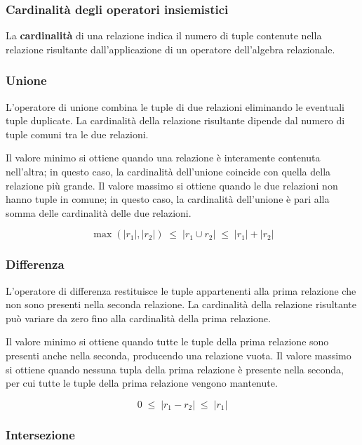 \subsubsection{Cardinalità degli operatori insiemistici}

La \textbf{cardinalità} di una relazione indica il numero di tuple
contenute nella relazione risultante dall'applicazione di un operatore
dell'algebra relazionale.

\subsubsection*{Unione}

L'operatore di unione combina le tuple di due relazioni eliminando le
eventuali tuple duplicate.  
La cardinalità della relazione risultante dipende dal numero di tuple
comuni tra le due relazioni.

Il valore minimo si ottiene quando una relazione è interamente contenuta
nell'altra; in questo caso, la cardinalità dell'unione coincide con
quella della relazione più grande.  
Il valore massimo si ottiene quando le due relazioni non hanno tuple in
comune; in questo caso, la cardinalità dell'unione è pari alla somma
delle cardinalità delle due relazioni.

\[
\max(|r_1|, |r_2|) \;\le\; |r_1 \cup r_2| \;\le\; |r_1| + |r_2|
\]

\subsubsection*{Differenza}

L'operatore di differenza restituisce le tuple appartenenti alla prima
relazione che non sono presenti nella seconda relazione.  
La cardinalità della relazione risultante può variare da zero fino alla
cardinalità della prima relazione.

Il valore minimo si ottiene quando tutte le tuple della prima relazione
sono presenti anche nella seconda, producendo una relazione vuota.  
Il valore massimo si ottiene quando nessuna tupla della prima relazione è
presente nella seconda, per cui tutte le tuple della prima relazione
vengono mantenute.

\[
0 \;\le\; |r_1 - r_2| \;\le\; |r_1|
\]

\subsubsection*{Intersezione}

